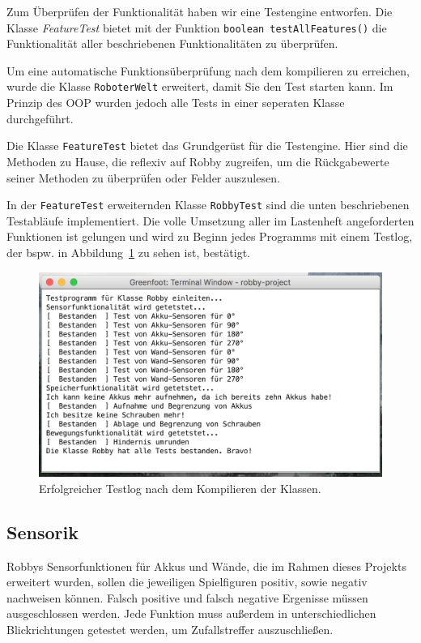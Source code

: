 Zum Überprüfen der Funktionalität haben wir eine Testengine entworfen. Die Klasse \emph{FeatureTest} bietet mit der Funktion \texttt{boolean testAllFeatures()} die Funktionalität aller beschriebenen Funktionalitäten zu überprüfen.

Um eine automatische Funktionsüberprüfung nach dem kompilieren zu erreichen, wurde die Klasse \texttt{RoboterWelt} erweitert, damit Sie den Test starten kann. Im Prinzip des OOP wurden jedoch alle Tests in einer seperaten Klasse durchgeführt.

Die Klasse \texttt{FeatureTest} bietet das Grundgerüst für die Testengine. Hier sind die Methoden zu Hause, die reflexiv auf Robby zugreifen, um die Rückgabewerte seiner Methoden zu überprüfen oder Felder auszulesen.

In der \texttt{FeatureTest} erweiternden Klasse \texttt{RobbyTest} sind die unten beschriebenen Testabläufe implementiert. Die volle Umsetzung aller im Lastenheft angeforderten Funktionen ist gelungen und wird zu Beginn jedes Programms mit einem Testlog, der bspw. in Abbildung~\ref{img:testlog} zu sehen ist, bestätigt.

\begin{figure}
\centering
\includegraphics[width=\linewidth]{img/testlog}
\caption{Erfolgreicher Testlog nach dem Kompilieren der Klassen. }
\label{img:testlog}
\end{figure}

\subsection{Sensorik}
Robbys Sensorfunktionen für Akkus und Wände, die im Rahmen dieses Projekts erweitert wurden, sollen die jeweiligen Spielfiguren positiv, sowie negativ nachweisen können. Falsch positive und falsch negative Ergenisse müssen ausgeschlossen werden. Jede Funktion muss au\ss{}erdem in unterschiedlichen Blickrichtungen getestet werden, um Zufallstreffer auszuschlie\ss{}en.


